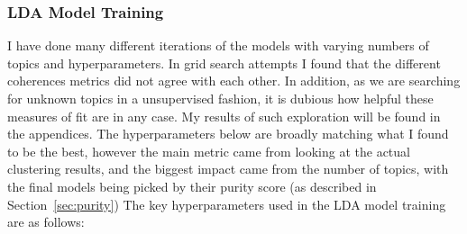 \documentclass[12pt]{article}
\begin{document}
\subsubsection*{LDA Model Training}

I have done many different iterations of the models with varying numbers of topics and
hyperparameters. In grid search attempts I found that the different coherences metrics did not agree
with each other. In addition, as we are searching for unknown topics in a unsupervised fashion, it
is dubious how helpful these measures of fit are in any case. My results of such exploration will be
found in the appendices. The hyperparameters below are broadly matching what I found to be the best,
however the main metric came from looking at the actual clustering results, and the biggest impact
came from the number of topics, with the final models being picked by their purity score (as
described in Section~\ref{sec:purity}) The key hyperparameters used in the LDA model training are as
follows:
\end{document}
